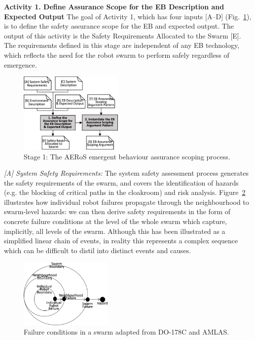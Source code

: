 \documentclass{article}
\begin{document}
\noindent\textbf{Activity 1. Define Assurance Scope for the EB Description and Expected Output}
The goal of Activity 1, which has four inputs [A--D] (Fig.~\ref{aeros-stage1}), is to define the safety assurance scope for the EB and expected output. The output of this activity is the Safety Requirements Allocated to the Swarm [E]. The requirements defined in this stage are independent of any EB technology, which reflects the need for the robot swarm to perform safely regardless of emergence.  
\begin{figure}[!h]
	\centering
	\centering
	\includegraphics[width=0.45\textwidth]{AERoS-Stage1.png}
	\caption{Stage 1: The AERoS emergent behaviour assurance scoping process.}
	\label{aeros-stage1}
\end{figure}

\emph{[A] System Safety Requirements:}
The system safety assessment process generates the safety requirements of the swarm, and covers the identification of hazards (e.g. the blocking of critical paths in the cloakroom) and risk analysis.
Figure~\ref{failure-events} illustrates how individual robot failures propagate through the neighbourhood to swarm-level hazards: we can then derive safety requirements in the form of concrete failure conditions at the level of the whole swarm which capture, implicitly, all levels of the swarm. 
Although this has been illustrated as a simplified linear chain of events, in reality this represents a complex sequence which can be difficult to distil into distinct events and causes. 
\begin{figure}[!h]
	\centering
	\includegraphics[width=0.40\textwidth]{AERoS-Stage1-Failureevents.png}
	\caption{Failure conditions in a swarm adapted from DO-178C and AMLAS.}
	\label{failure-events}
\end{figure}
\end{document}

